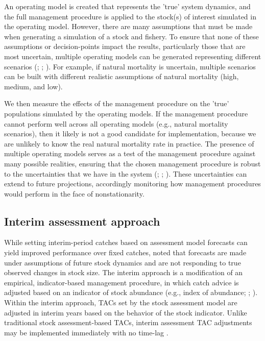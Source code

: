 \documentclass[12pt,english]{article}
\begin{document}
\begin{flushleft}
\begin{spacing}{1.9}
An operating model is created that represents the 'true' system dynamics, and the full management procedure is applied to the stock(s) of interest simulated in the operating model. However, there are many assumptions that must be made when generating a simulation of a stock and fishery. To ensure that none of these assumptions or decision-points impact the results, particularly those that are most uncertain, multiple operating models can be generated representing different scenarios (\citealt{ButterworthPunt1999}; \citealt{DeOliveiraEtAl2008}; \citealt{PuntEtAl2016}). For example, if natural mortality is uncertain, multiple scenarios can be built with different realistic assumptions of natural mortality (high, medium, and low).

We then measure the effects of the management procedure on the 'true' populations simulated by the operating models. If the management procedure cannot perform well across all operating models (e.g., natural mortality scenarios), then it likely is not a good candidate for implementation, because we are unlikely to know the real natural mortality rate in practice. The presence of multiple operating models serves as a test of the management procedure against many possible realities, ensuring that the chosen management procedure is robust to the uncertainties that we have in the system (\citealt{ButterworthPunt1999}; \citealt{RademeyerEtAl2007}; \citealt{PuntEtAl2016}). These uncertainties can extend to future projections, accordingly monitoring how management procedures would perform in the face of nonstationarity.

\subsection*{Interim assessment approach}
	While setting interim-period catches based on assessment model forecasts can yield improved performance over fixed catches, \citet{HuynhEtAl2020} noted that forecasts are made under assumptions of future stock dynamics and are not responding to true observed changes in stock size. The interim approach is a modification of an empirical, indicator-based management procedure, in which catch advice is adjusted based on an indicator of stock abundance (e.g., index of abundance; \cite{GeromontButterworth2015}; \cite{CarruthersEtAl2016}). Within the interim approach, TACs set by the stock assessment model are adjusted in interim years based on the behavior of the stock indicator. Unlike traditional stock assessment-based TACs, interim assessment TAC adjustments may be implemented immediately with no time-lag \citep{HuynhEtAl2020}.


\end{spacing}
\end{flushleft}
\end{document}
